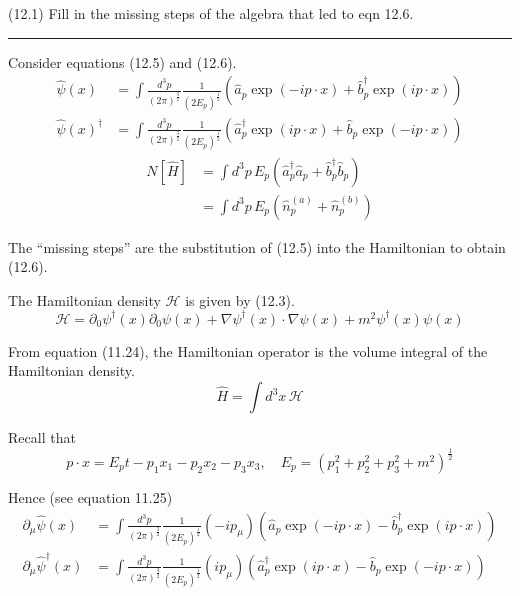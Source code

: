 \documentclass[12pt]{article}
\begin{document}
(12.1)
Fill in the missing steps of the algebra that led to
eqn 12.6.

\bigskip
\hrule

\bigskip
Consider equations (12.5) and (12.6).
\begin{equation*}
\begin{aligned}
\hat\psi(x)&=\int\frac{d^3p}{(2\pi)^\frac{3}{2}}\frac{1}{(2E_p)^\frac{1}{2}}
\left(\hat a_p\exp(-ip\cdot x)+\hat b_p^\dag\exp(ip\cdot x)\right)
\\
\hat\psi(x)^\dag&=\int\frac{d^3p}{(2\pi)^\frac{3}{2}}\frac{1}{(2E_p)^\frac{1}{2}}
\left(\hat a_p^\dag\exp(ip\cdot x)+\hat b_p\exp(-ip\cdot x)\right)
\end{aligned}
\tag{12.5}
\end{equation*}
\begin{equation*}
\begin{aligned}
N[\hat H]&=\int d^3p\,E_p\left(\hat a_p^\dag\hat a_p+\hat b_p^\dag\hat b_p\right)
\\
&=\int d^3p\,E_p\left(\hat n_p^{(a)}+\hat n_p^{(b)}\right)
\end{aligned}
\tag{12.6}
\end{equation*}

The ``missing steps'' are the substitution of (12.5) into the Hamiltonian to obtain (12.6).

\bigskip
The Hamiltonian density $\mathcal H$ is given by (12.3).
\begin{equation*}
\mathcal H=\partial_0\psi^\dag(x)\partial_0\psi(x)+\nabla\psi^\dag(x)\cdot\nabla\psi(x)+m^2\psi^\dag(x)\psi(x)
\tag{12.3}
\end{equation*}

From equation (11.24), the Hamiltonian operator is the volume integral of the Hamiltonian density.
\begin{equation*}
\hat H=\int d^3x\,\mathcal H
\end{equation*}

Recall that
\begin{equation*}
p\cdot x=E_pt-p_1x_1-p_2x_2-p_3x_3,\quad E_p=\left(p_1^2+p_2^2+p_3^2+m^2\right)^\frac{1}{2}
\end{equation*}

Hence (see equation 11.25)
\begin{equation*}
\begin{aligned}
\partial_\mu\hat\psi(x)
&=\int\frac{d^3p}{(2\pi)^\frac{3}{2}}\frac{1}{(2E_p)^\frac{1}{2}}(-ip_\mu)
\left(\hat a_p\exp(-ip\cdot x)-\hat b_p^\dag\exp(ip\cdot x)\right)
\\
\partial_\mu\hat\psi^\dag(x)
&=\int\frac{d^3p}{(2\pi)^\frac{3}{2}}\frac{1}{(2E_p)^\frac{1}{2}}(ip_\mu)
\left(\hat a_p^\dag\exp(ip\cdot x)-\hat b_p\exp(-ip\cdot x)\right)
\end{aligned}
\end{equation*}
\end{document}
